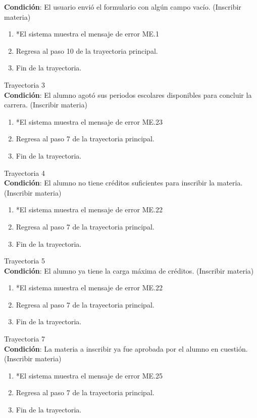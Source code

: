 \textbf{Condición}: El usuario envió el formulario con algún campo vacío. (Inscribir materia)
\begin{enumerate}
    \item *El sistema muestra el mensaje de error ME.1
    \item Regresa al paso 10 de la trayectoria principal.
    \item Fin de la trayectoria.
\end{enumerate}
\large{Trayectoria 3}\\
\textbf{Condición}: El alumno agotó sus periodos escolares disponibles para concluir la carrera. (Inscribir materia)
\begin{enumerate}
    \item *El sistema muestra el mensaje de error ME.23
    \item Regresa al paso 7 de la trayectoria principal.
    \item Fin de la trayectoria.
\end{enumerate}
\large{Trayectoria 4}\\
\textbf{Condición}: El alumno no tiene créditos suficientes para inscribir la materia. (Inscribir materia)
\begin{enumerate}
    \item *El sistema muestra el mensaje de error ME.22
    \item Regresa al paso 7 de la trayectoria principal.
    \item Fin de la trayectoria.
\end{enumerate}
\large{Trayectoria 5}\\
\textbf{Condición}: El alumno ya tiene la carga máxima de créditos. (Inscribir materia)
\begin{enumerate}
    \item *El sistema muestra el mensaje de error ME.22
    \item Regresa al paso 7 de la trayectoria principal.
    \item Fin de la trayectoria.
\end{enumerate}
\large{Trayectoria 7}\\
\textbf{Condición}: La materia a inscribir ya fue aprobada por el alumno en cuestión. (Inscribir materia)
\begin{enumerate}
    \item *El sistema muestra el mensaje de error ME.25
    \item Regresa al paso 7 de la trayectoria principal.
    \item Fin de la trayectoria.
\end{enumerate}
